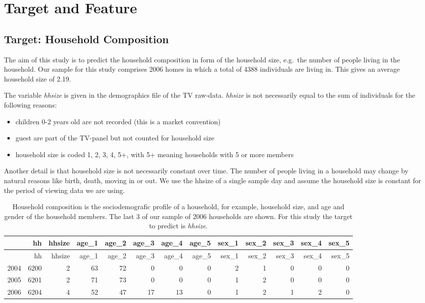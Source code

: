 \documentclass[]{article}
\providecommand{\tightlist}{%
  \setlength{\itemsep}{0pt}\setlength{\parskip}{0pt}}
\begin{document}
\hypertarget{target-and-feature}{%
\section{Target and Feature}\label{target-and-feature}}

\hypertarget{target-household-composition}{%
\subsection{Target: Household
Composition}\label{target-household-composition}}

The aim of this study is to predict the household composition in form of
the household size, e.g.~the number of people living in the household.
Our sample for this study comprises 2006 homes in which a total of 4388
individuals are living in. This gives an average household size of 2.19.

The variable \emph{hhsize} is given in the demographics file of the TV
raw-data. \emph{hhsize} is not necessarily equal to the sum of
individuals for the following reasons:

\begin{itemize}
\tightlist
\item
  children 0-2 years old are not recorded (this is a market convention)
\item
  guest are part of the TV-panel but not counted for household size
\item
  household size is coded 1, 2, 3, 4, 5+, with 5+ meaning households
  with 5 or more members
\end{itemize}

Another detail is that household size is not necessarily constant over
time. The number of people living in a household may change by natural
reasons like birth, death, moving in or out. We use the hhsize of a
single sample day and assume the household size is constant for the
period of viewing data we are using.

\begin{longtable}[]{@{}lrrrrrrrrrrrr@{}}
\caption{Household composition is the sociodemografic profile of a
household, for example, household size, and age and gender of the
household members. The last 3 of our sample of 2006 households are
shown. For this study the target to predict is
\emph{hhsize}.}\tabularnewline
\toprule
& hh & hhsize & age\_1 & age\_2 & age\_3 & age\_4 & age\_5 & sex\_1 &
sex\_2 & sex\_3 & sex\_4 & sex\_5\tabularnewline
\midrule
\endfirsthead
\toprule
& hh & hhsize & age\_1 & age\_2 & age\_3 & age\_4 & age\_5 & sex\_1 &
sex\_2 & sex\_3 & sex\_4 & sex\_5\tabularnewline
\midrule
\endhead
2004 & 6200 & 2 & 63 & 72 & 0 & 0 & 0 & 2 & 1 & 0 & 0 & 0\tabularnewline
2005 & 6201 & 2 & 71 & 73 & 0 & 0 & 0 & 1 & 2 & 0 & 0 & 0\tabularnewline
2006 & 6204 & 4 & 52 & 47 & 17 & 13 & 0 & 1 & 2 & 1 & 2 &
0\tabularnewline
\bottomrule
\end{longtable}
\end{document}
